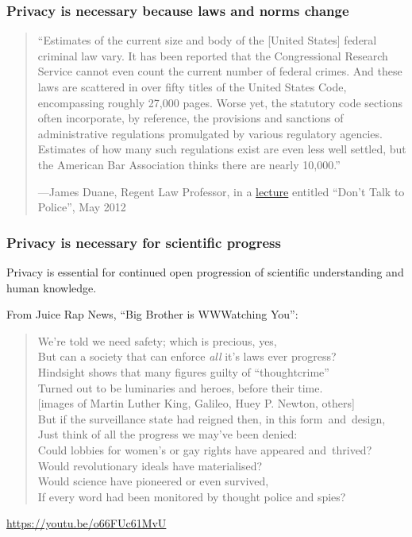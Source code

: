 \begin{frame}
  \frametitle{Privacy is necessary because laws and norms change}
  \begin{quotation}
    ``Estimates of the current size and body of the [United States]
    federal criminal law vary. It has been reported that the
    Congressional Research Service cannot even count the current
    number of federal crimes.  And these laws are scattered in over fifty
    titles of the United States Code, encompassing roughly 27,000
    pages. Worse yet, the statutory code sections often incorporate,
    by reference, the provisions and sanctions of administrative
    regulations promulgated by various regulatory agencies. Estimates
    of how many such regulations exist are even less well settled, but
    the American Bar Association thinks there are nearly 10,000.'' \\
    \hfill{\raggedright---James Duane, Regent Law Professor, in a
      \href{https://www.youtube.com/watch?v=d-7o9xYp7eE}{lecture}
      entitled ``Don't Talk to Police'', May 2012}
  \end{quotation}
\end{frame}


\begin{frame}
  \frametitle{Privacy is necessary for scientific progress}

  Privacy is essential for continued open progression of scientific
  understanding and human knowledge.


  \begin{block}{From Juice Rap News, ``Big Brother is WWWatching You'':}
  \begin{quotation}
    \footnotesize
    We're told we need safety; which is precious, yes, \\
    But can a society that can enforce \emph{all} it's laws ever progress? \\
    Hindsight shows that many figures guilty of ``thoughtcrime'' \\
    Turned out to be luminaries and heroes, before their time. \\
    {[}images of Martin Luther King, Galileo, Huey P. Newton, others{]} \\
    But if the surveillance state had reigned then, in this form~and~design, \\
    Just think of all the progress we may've been denied: \\
    Could lobbies for women's or gay rights have appeared and~thrived? \\
    Would revolutionary ideals have materialised? \\
    Would science have pioneered or even survived, \\
    If every word had been monitored by thought police and spies?
    \normalsize
  \end{quotation}
  \small\url{https://youtu.be/o66FUc61MvU}\normalsize
  \end{block}

\end{frame}



